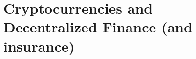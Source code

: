 \documentclass{beamer}
\begin{document}





\section{Cryptocurrencies and Decentralized Finance (and insurance)}
\end{document}
